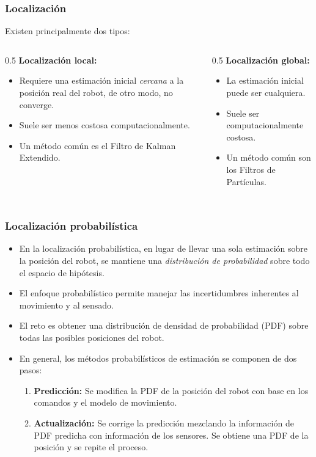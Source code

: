 \begin{frame}\frametitle{Localización}
  Existen principalmente dos tipos:
\[\]
  \begin{columns}
    \begin{column}{0.5\textwidth}
      \textbf{Localización local: }
      \begin{itemize}
      \item Requiere una estimación inicial \textit{cercana} a la posición real del robot, de otro modo, no converge.
      \item Suele ser menos costosa computacionalmente.
      \item Un método común es el Filtro de Kalman Extendido.
      \end{itemize}
    \end{column}
    \begin{column}{0.5\textwidth}
      \textbf{Localización global:}
      \begin{itemize}
      \item La estimación inicial puede ser cualquiera.
      \item Suele ser computacionalmente costosa.
      \item Un método común son los Filtros de Partículas. 
      \end{itemize}
      \[\]
      \[\]
    \end{column}
  \end{columns}
\end{frame}

\begin{frame}\frametitle{Localización probabilística}
  \begin{itemize}
  \item En la localización probabilística, en lugar de llevar una sola estimación sobre la posición del robot, se mantiene una \textit{distribución de probabilidad} sobre todo el espacio de hipótesis.
  \item El enfoque probabilístico permite manejar las incertidumbres inherentes al movimiento y al sensado.
  \item El reto es obtener una distribución de densidad de probabilidad (PDF) sobre todas las posibles posiciones del robot.
  \item En general, los métodos probabilísticos de estimación se componen de dos pasos:
    \begin{enumerate}
    \item \textbf{Predicción:} Se modifica la PDF de la posición del robot con base en los comandos y el modelo de movimiento.
    \item \textbf{Actualización:} Se corrige la predicción mezclando la información de PDF predicha con información de los sensores. Se obtiene una PDF de la posición y se repite el proceso. 
    \end{enumerate}
  \end{itemize}
  
\end{frame}

